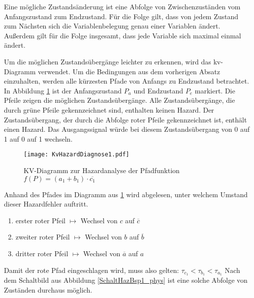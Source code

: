 Eine mögliche Zustandsänderung ist eine Abfolge von Zwischenzuständen vom Anfangszustand zum Endzustand. Für die Folge gilt, dass von jedem Zustand zum Nächsten sich die Variablenbelegung genau einer Variablen ändert. Außerdem gilt für die Folge insgesamt, dass jede Variable sich maximal einmal ändert. 

Um die möglichen Zustandsübergänge leichter zu erkennen, wird das {\sc kv}-Diagramm verwendet. Um die Bedingungen aus dem vorherigen Absatz einzuhalten, werden alle kürzesten Pfade von Anfangs zu Endzustand betrachtet. In Abbildung \ref{KvHazDiag1} ist der Anfangszustand $P_a$ und Endzustand $P_e$ markiert. Die Pfeile zeigen die möglichen Zustandsübergänge. Alle Zustandsübergänge, die durch grüne Pfeile gekennzeichnet sind, enthalten keinen Hazard. Der Zustandsübergang, der durch die Abfolge roter Pfeile gekennzeichnet ist, enthält einen Hazard. Das Ausgangssignal würde bei diesem Zustandsübergang von 0 auf 1 auf 0 auf 1 wechseln.
\begin{figure}[htp]
	\centering
	\texttt{[image: KvHazardDiagnose1.pdf]}
	\caption{KV-Diagramm zur Hazardanalyse der Pfadfunktion $f(P) = (a_1 + b_1) \cdot \overline{c_1}$}
	\label{KvHazDiag1}
\end{figure}

Anhand des Pfades im Diagramm aus \ref{KvHazDiag1} wird abgelesen, unter welchem Umstand dieser Hazardfehler auftritt.
\begin{enumerate}
  \item erster roter Pfeil $\mapsto$ Wechsel von $c$ auf $\overline{c}$
  \item zweiter roter Pfeil $\mapsto$ Wechsel von $b$ auf $\overline{b}$ 
  \item dritter roter Pfeil $\mapsto$ Wechsel von $\overline{a}$ auf $a$
\end{enumerate}
Damit der rote Pfad eingeschlagen wird, muss also gelten: $\tau_{c_1} < \tau_{b_1} < \tau_{a_1}$
Nach dem Schaltbild aus Abbildung \ref{SchaltHazBsp1_phys} ist eine solche Abfolge von Zuständen durchaus möglich.

